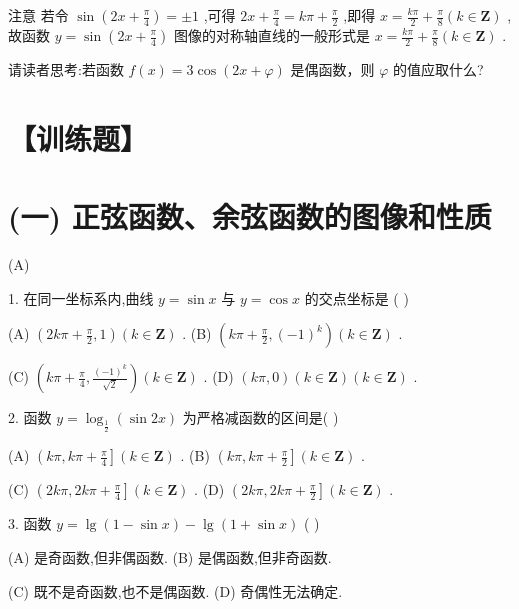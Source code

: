 \documentclass[10pt]{article}
\begin{document}
注意 若令 \(\sin \left( {{2x} + \frac{\pi }{4}}\right)  =  \pm  1\) ,可得 \({2x} + \frac{\pi }{4} = {k\pi } + \frac{\pi }{2}\) ,即得 \(x = \frac{k\pi }{2} + \frac{\pi }{8}\left( {k \in  \mathbf{Z}}\right)\) ,故函数 \(y = \sin \left( {{2x} + \frac{\pi }{4}}\right)\) 图像的对称轴直线的一般形式是 \(x = \frac{k\pi }{2} + \frac{\pi }{8}\left( {k \in  \mathbf{Z}}\right)\) .

请读者思考:若函数 \(f\left( x\right)  = 3\cos \left( {{2x} + \varphi }\right)\) 是偶函数，则 \(\varphi\) 的值应取什么?

\section*{【训练题】}

\section*{(一) 正弦函数、余弦函数的图像和性质}

(A)

1. 在同一坐标系内,曲线 \(y = \sin x\) 与 \(y = \cos x\) 的交点坐标是 ( )

(A) \(\left( {{2k\pi } + \frac{\pi }{2},1}\right) \left( {k \in  \mathbf{Z}}\right)\) . (B) \(\left( {{k\pi } + \frac{\pi }{2},{\left( -1\right) }^{k}}\right) \left( {k \in  \mathbf{Z}}\right)\) .

(C) \(\left( {{k\pi } + \frac{\pi }{4},\frac{{\left( -1\right) }^{k}}{\sqrt{2}}}\right) \left( {k \in  \mathbf{Z}}\right)\) . (D) \(\left( {{k\pi },0}\right) \left( {k \in  \mathbf{Z}}\right) \left( {k \in  \mathbf{Z}}\right)\) .

2. 函数 \(y = {\log }_{\frac{1}{2}}\left( {\sin {2x}}\right)\) 为严格减函数的区间是( )

(A) \(\left( {{k\pi },{k\pi } + \frac{\pi }{4}}\right\rbrack  \left( {k \in  \mathbf{Z}}\right)\) . (B) \(\left( {{k\pi },{k\pi } + \frac{\pi }{2}}\right\rbrack  \left( {k \in  \mathbf{Z}}\right)\) .

(C) \(\left( {{2k\pi },{2k\pi } + \frac{\pi }{4}}\right\rbrack  \left( {k \in  \mathbf{Z}}\right)\) . (D) \(\left( {{2k\pi },{2k\pi } + \frac{\pi }{2}}\right\rbrack  \left( {k \in  \mathbf{Z}}\right)\) .

3. 函数 \(y = \lg \left( {1 - \sin x}\right)  - \lg \left( {1 + \sin x}\right)\) ( )

(A) 是奇函数,但非偶函数. (B) 是偶函数,但非奇函数.

(C) 既不是奇函数,也不是偶函数. (D) 奇偶性无法确定.
\end{document}
